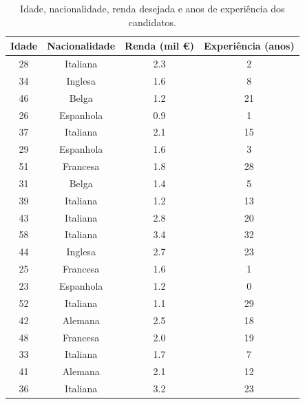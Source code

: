 \documentclass[12pt,a4paper]{article}
\begin{document}
\begin{table}[H]
\centering
\caption{Idade, nacionalidade, renda desejada e anos de experiência dos candidatos.}
\label{tab:candidatos}
\begin{tabular}{cccc}
\toprule
\textbf{Idade} & \textbf{Nacionalidade} & \textbf{Renda (mil €)} & \textbf{Experiência (anos)} \\
\midrule
28 & Italiana  & 2.3 & 2  \\
34 & Inglesa   & 1.6 & 8  \\
46 & Belga     & 1.2 & 21 \\
26 & Espanhola & 0.9 & 1  \\
37 & Italiana  & 2.1 & 15 \\
29 & Espanhola & 1.6 & 3  \\
51 & Francesa  & 1.8 & 28 \\
31 & Belga     & 1.4 & 5  \\
39 & Italiana  & 1.2 & 13 \\
43 & Italiana  & 2.8 & 20 \\
58 & Italiana  & 3.4 & 32 \\
44 & Inglesa   & 2.7 & 23 \\
25 & Francesa  & 1.6 & 1  \\
23 & Espanhola & 1.2 & 0  \\
52 & Italiana  & 1.1 & 29 \\
42 & Alemana   & 2.5 & 18 \\
48 & Francesa  & 2.0 & 19 \\
33 & Italiana  & 1.7 & 7  \\
41 & Alemana   & 2.1 & 12 \\
36 & Italiana  & 3.2 & 23 \\
\bottomrule
\end{tabular}
\end{table}
\end{document}
